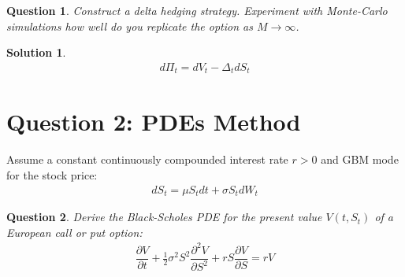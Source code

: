 \documentclass[16pt]{article}
\newtheorem{qu}{Question}[section]
\newtheorem{sol}{Solution}[section]
\begin{document}
	\begin{qu}
		Construct a delta hedging strategy. Experiment with Monte-Carlo simulations
		how well do you replicate the option as $M \rightarrow \infty$.
	\end{qu}	

	\begin{sol}
		\begin{eqnarray}
			d \Pi_t = d V_t -  \Delta_t d S_t
		\end{eqnarray}
	\end{sol}
	
	\section{Question 2: PDEs Method}
	Assume a constant continuously compounded interest rate
	$r > 0$ and GBM mode for the stock price:
	\begin{align}
		d S_{t} = \mu S_{t} d t  +  \sigma S_{t} d W_{t}
	\end{align}

	\begin{qu}
		Derive the Black-Scholes PDE for the present value $V(t, S_{t})$ of a European call or put option:
		\begin{align}
			\dfrac{\partial V}{\partial t} + \frac{1}{2} \sigma^2 S^2 \dfrac{\partial^2 V}{\partial S^2} + rS \dfrac{\partial V}{\partial S} = rV
		\end{align}
	\end{qu}
	
\end{document}
